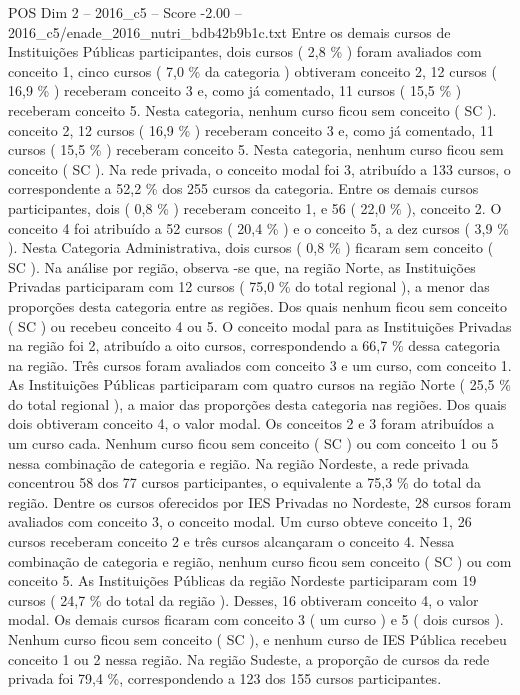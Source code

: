 \begin{textsample}{POS Dim 2 – 2016\_c5 – Score -2.00 – 2016\_c5/enade\_2016\_nutri\_bdb42b9b1c.txt}
Entre os demais cursos de Instituições Públicas participantes, dois cursos ( 2,8 \% ) foram avaliados com conceito 1, cinco cursos ( 7,0 \% da categoria ) obtiveram conceito 2, 12 cursos ( 16,9 \% ) receberam conceito 3 e, como já comentado, 11 cursos ( 15,5 \% ) receberam conceito 5.
Nesta categoria, nenhum curso ficou sem conceito ( SC ). conceito 2, 12 cursos ( 16,9 \% ) receberam conceito 3 e, como já comentado, 11 cursos ( 15,5 \% ) receberam conceito 5.
Nesta categoria, nenhum curso ficou sem conceito ( SC ).
Na rede privada, o conceito modal foi 3, atribuído a 133 cursos, o correspondente a 52,2 \% dos 255 cursos da categoria.
Entre os demais cursos participantes, dois ( 0,8 \% ) receberam conceito 1, e 56 ( 22,0 \% ), conceito 2.
O conceito 4 foi atribuído a 52 cursos ( 20,4 \% ) e o conceito 5, a dez cursos ( 3,9 \% ).
Nesta Categoria Administrativa, dois cursos ( 0,8 \% ) ficaram sem conceito ( SC ).
Na análise por região, observa -se que, na região Norte, as Instituições Privadas participaram com 12 cursos ( 75,0 \% do total regional ), a menor das proporções desta categoria entre as regiões.
Dos quais nenhum ficou sem conceito ( SC ) ou recebeu conceito 4 ou 5.
O conceito modal para as Instituições Privadas na região foi 2, atribuído a oito cursos, correspondendo a 66,7 \% dessa categoria na região.
Três cursos foram avaliados com conceito 3 e um curso, com conceito 1.
As Instituições Públicas participaram com quatro cursos na região Norte ( 25,5 \% do total regional ), a maior das proporções desta categoria nas regiões.
Dos quais dois obtiveram conceito 4, o valor modal.
Os conceitos 2 e 3 foram atribuídos a um curso cada.
Nenhum curso ficou sem conceito ( SC ) ou com conceito 1 ou 5 nessa combinação de categoria e região.
Na região Nordeste, a rede privada concentrou 58 dos 77 cursos participantes, o equivalente a 75,3 \% do total da região.
Dentre os cursos oferecidos por IES Privadas no Nordeste, 28 cursos foram avaliados com conceito 3, o conceito modal.
Um curso obteve conceito 1, 26 cursos receberam conceito 2 e três cursos alcançaram o conceito 4.
Nessa combinação de categoria e região, nenhum curso ficou sem conceito ( SC ) ou com conceito 5.
As Instituições Públicas da região Nordeste participaram com 19 cursos ( 24,7 \% do total da região ).
Desses, 16 obtiveram conceito 4, o valor modal.
Os demais cursos ficaram com conceito 3 ( um curso ) e 5 ( dois cursos ).
Nenhum curso ficou sem conceito ( SC ), e nenhum curso de IES Pública recebeu conceito 1 ou 2 nessa região.
Na região Sudeste, a proporção de cursos da rede privada foi 79,4 \%, correspondendo a 123 dos 155 cursos participantes.

\end{textsample}
